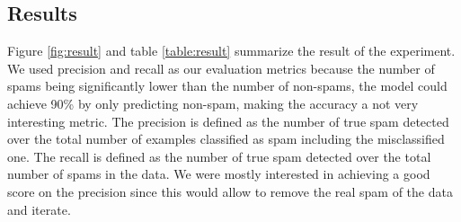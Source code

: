\documentclass[10pt]{article}
\begin{document}
\subsection{Results}
Figure \ref{fig:result} and table \ref{table:result} summarize the result of the experiment. We used precision and recall as our evaluation metrics because the number of spams being significantly lower than the number of non-spams, the model could achieve 90\% by only predicting non-spam, making the accuracy a not very interesting metric. The precision is defined as the number of true spam detected over the total number of examples classified as spam including the misclassified one. The recall is defined as the number of true spam detected over the total number of spams in the data. We were mostly interested in achieving a good score on the precision since this would allow to remove the real spam of the data and iterate.
\end{document}

